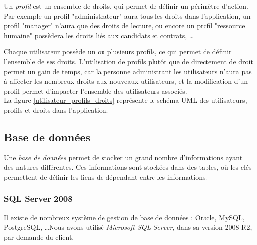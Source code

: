 Un \textit{profil} est un ensemble de droits, qui permet de définir un périmètre d'action. Par exemple un profil "administrateur" aura tous les droits dans l'application, un profil "manager" n'aura que des droits de lecture, ou encore un profil "ressource humaine" possèdera les droits liés aux candidats et contrats, \ldots

Chaque utilisateur possède un ou plusieurs profils, ce qui permet de définir l'ensemble de ses droits. L'utilisation de profils plutôt que de directement de droit permet un gain de temps, car la personne administrant les utilisateurs n'aura pas à affecter les nombreux droits aux nouveaux utilisateurs, et la modification d'un profil permet d'impacter l'ensemble des utilisateurs associés.
\\

La figure \ref{utilisateur_profils_droits} représente le schéma UML des utilisateurs, profils et droits dans l'application.


\subsection{Base de données}

Une \textit{base de données} permet de stocker un grand nombre d'informations ayant des natures différentes. Ces informations sont stockées dans des tables, où les clés permettent de définir les liens de dépendant entre les informations.


\subsubsection{SQL Server 2008}

Il existe de nombreux système de gestion de base de données : Oracle, MySQL, PostgreSQL, \ldots Nous avons utilisé \textit{Microsoft SQL Server}, dans sa version 2008 R2, par demande du client.

